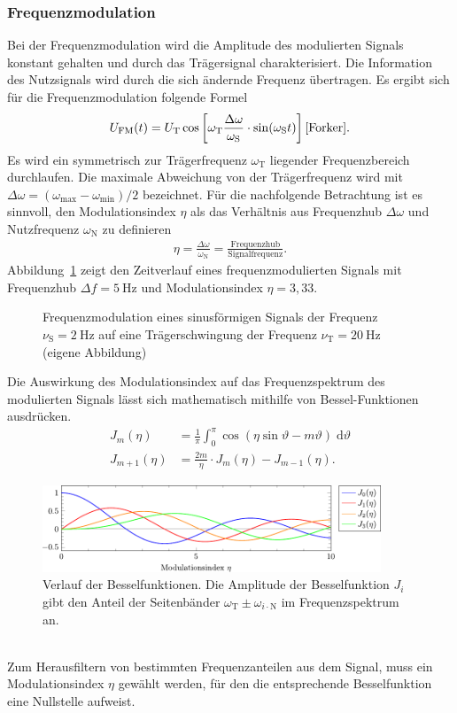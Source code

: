 \documentclass[a4paper,twoside,final]{article}
\begin{document}
\subsubsection{Frequenzmodulation}
Bei der Frequenzmodulation wird die Amplitude des modulierten Signals konstant gehalten und durch das Trägersignal charakterisiert. Die Information des Nutzsignals wird durch die sich ändernde Frequenz übertragen. Es ergibt sich für die Frequenzmodulation folgende Formel
\begin{align}
  U_\text{FM}(t) = U_\text{T} \cos\left[\omega_\text{T} \frac{\Delta \omega}{\omega_\text{S}}\cdot \sin(\omega_\text{S}t)\right] \cite{Forker}.
\end{align}
Es wird ein symmetrisch zur Trägerfrequenz $\omega_\text{T}$ liegender Frequenzbereich durchlaufen. Die maximale Abweichung von der Trägerfrequenz wird mit $\Delta \omega = (\omega_\text{max}-\omega_\text{min})/2$ bezeichnet. Für die nachfolgende Betrachtung ist es sinnvoll, den Modulationsindex $\eta$ als das Verhältnis aus Frequenzhub $\Delta \omega$ und Nutzfrequenz $\omega_\text{N}$ zu definieren
\begin{align}
  \eta = \frac{\Delta \omega}{\omega_\text{N}} = \frac{\text{Frequenzhub}}{\text{Signalfrequenz}}.
\end{align}
Abbildung~\ref{fig:FM} zeigt den Zeitverlauf eines frequenzmodulierten Signals mit Frequenzhub $\Delta f = \SI{5}{\hertz}$ und Modulationsindex $\eta = 3,33$.
\begin{figure}[htp]
    \centering
        
    \caption{Frequenzmodulation eines sinusförmigen Signals der Frequenz $\nu_\text{S} = \SI{2}{\hertz}$ auf eine Trägerschwingung der Frequenz $\nu_\text{T} = \SI{20}{\hertz}$ (eigene Abbildung)}
    \label{fig:FM}
\end{figure}
\FloatBarrier
\noindent
Die Auswirkung des Modulationsindex auf das Frequenzspektrum des modulierten Signals lässt sich mathematisch mithilfe von Bessel-Funktionen ausdrücken.
\begin{align}
    J_m(\eta) &= \frac{1}{\pi}\int_0^\pi \cos(\eta\sin \vartheta - m\vartheta)\; \text{d}\vartheta\\
    J_{m+1} (\eta) &= \frac{2m}{\eta} \cdot J_m(\eta) - J_{m-1}(\eta).
\end{align}
\begin{figure}[htp]
    \centering
    \includegraphics[width=0.9\textwidth]{Schaltungen/Besselfunktion.pdf}
    \caption{Verlauf der Besselfunktionen. Die Amplitude der Besselfunktion $J_i$ gibt den Anteil der Seitenbänder $\omega_\text{T}\pm\omega_{i\cdot\text{N}}$ im Frequenzspektrum an.}
    \label{fig:Besselfunktionen}
\end{figure}\\
Zum Herausfiltern von bestimmten Frequenzanteilen aus dem Signal, muss ein Modulationsindex $\eta$ gewählt werden, für den die entsprechende Besselfunktion eine Nullstelle aufweist.
\newpage
\end{document}
